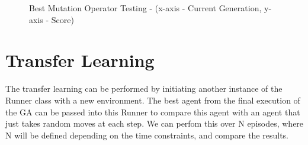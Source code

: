 \begin{figure}[ht]
{\begin{minipage}[c]{0.3\textwidth}
    \end{minipage}}
  \hfill
  \hfill
  \caption{Best Mutation Operator Testing - (x-axis - Current Generation, y-axis - Score)}
  \label{fig:mot}
\end{figure}


\section{Transfer Learning}

The transfer learning can be performed by initiating another instance of the Runner class with a new environment. The best agent from the final execution of the GA can be passed into this Runner to compare this agent with an agent that just takes random moves at each step. We can perfom this over N episodes, where N will be defined depending on the time constraints, and compare the results.
